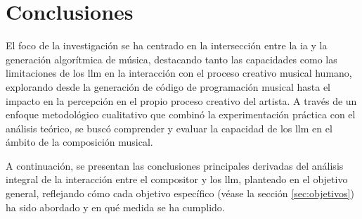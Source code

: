 \chapter{Conclusiones}



El foco de la investigación se ha centrado en la intersección entre la \gls{ia} y la generación algorítmica de música, destacando tanto las capacidades como las limitaciones de los \gls{llm} en la interacción con el proceso creativo musical humano, explorando desde la generación de código de programación musical hasta el impacto en la percepción en el propio proceso creativo del artista. A través de un enfoque metodológico cualitativo que combinó la experimentación práctica con el análisis teórico, se buscó comprender y evaluar la capacidad de los \gls{llm} en el ámbito de la composición musical. 


A continuación, se presentan las conclusiones principales derivadas del análisis integral de la interacción entre el compositor y los \gls{llm}, planteado en el objetivo general, reflejando cómo cada objetivo específico (véase la sección \ref{sec:objetivos}) ha sido abordado y en qué medida se ha cumplido. 

